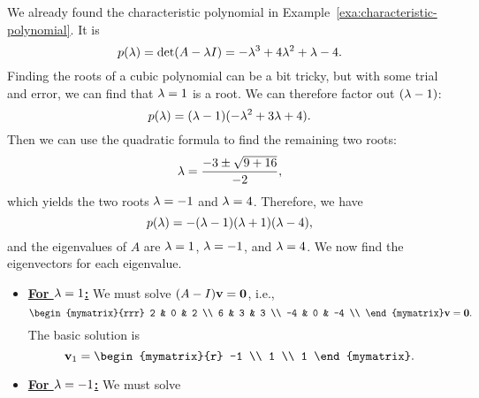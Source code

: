 \begin{solution}
  We already found the characteristic polynomial in
  Example~\ref{exa:characteristic-polynomial}. It is
  \begin{equation*}
    p(\lambda) = \det(A-\lambda I) = -\lambda^3 +4\lambda^2 +\lambda - 4.
  \end{equation*}
  Finding the roots%
  of a cubic polynomial can be a bit tricky, but
  with some trial and error, we can find that $\lambda=1$ is a
  root. We can therefore factor out $(\lambda-1)$:
  \begin{equation*}
    p(\lambda) = (\lambda-1)(-\lambda^2+3\lambda+4).
  \end{equation*}
  Then we can use the quadratic formula to find the remaining two
  roots:
  \begin{equation*}
    \lambda = \frac{-3\pm\sqrt{9+16}}{-2},
  \end{equation*}
  which yields the two roots $\lambda=-1$ and $\lambda=4$. Therefore,
  we have
  \begin{equation*}
    p(\lambda) = -(\lambda-1)(\lambda+1)(\lambda-4),
  \end{equation*}
  and the eigenvalues of $A$ are $\lambda=1$, $\lambda=-1$, and
  $\lambda=4$. We now find the eigenvectors for each eigenvalue.
  \begin{itemize}
  \item {\bf{\underline{For $\lambda=1$:}}} We must solve
    $(A-I)\/\vect{v}=\vect{0}$, i.e.,
    \begin{equation*}
      \begin{mymatrix}{rrr}
        2  & 0 &  2 \\
        6  & 3 &  3 \\
        -4 & 0 & -4 \\
      \end{mymatrix}\vect{v}=\vect{0}.
    \end{equation*}
    The basic solution is
    \begin{equation*}
      \vect{v}_1 = \begin{mymatrix}{r} -1 \\ 1 \\ 1 \end{mymatrix}.
    \end{equation*}
  \item {\bf{\underline{For $\lambda=-1$:}}} We must solve

\end{itemize}
\end{solution}
